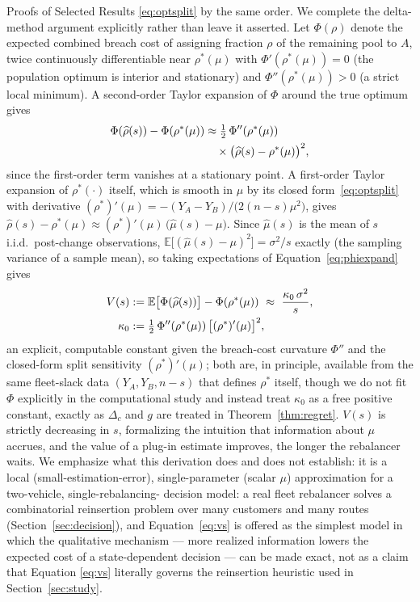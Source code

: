 \documentclass[trsc,dblanonrev]{informs4}
\newcommand{\E}{\mathbb{E}}
\begin{document}
\begin{APPENDIX}{Proofs of Selected Results}
\eqref{eq:optsplit} by the same order. We complete the
delta-method argument explicitly rather than leave it asserted. Let
$\Phi(\rho)$ denote the expected combined breach cost of assigning
fraction $\rho$ of the remaining pool to $A$, twice continuously
differentiable near $\rho^\ast(\mu)$ with $\Phi'(\rho^\ast(\mu)) = 0$
(the population optimum is interior and stationary) and
$\Phi''(\rho^\ast(\mu)) > 0$ (a strict local minimum). A second-order
Taylor expansion of $\Phi$ around the true optimum gives
\begin{align}
\Phi(\widehat\rho(s)) - \Phi(\rho^\ast(\mu))
&\approx \tfrac12\, \Phi''(\rho^\ast(\mu)) \notag \\
&\quad {}\times \bigl(\widehat\rho(s) - \rho^\ast(\mu)\bigr)^2,
\label{eq:phiexpand}
\end{align}
since the first-order term vanishes at a stationary point. A first-order
Taylor expansion of $\rho^\ast(\cdot)$ itself, which is smooth in $\mu$
by its closed form~\eqref{eq:optsplit} with derivative $(\rho^\ast)'(\mu)
= -(Y_A - Y_B)/\bigl(2(n-s)\mu^2\bigr)$, gives $\widehat\rho(s) -
\rho^\ast(\mu) \approx (\rho^\ast)'(\mu)\,\bigl(\widehat\mu(s) -
\mu\bigr)$. Since $\widehat\mu(s)$ is the mean of $s$ i.i.d.\
post-change observations, $\E\bigl[(\widehat\mu(s)-\mu)^2\bigr] =
\sigma^2/s$ exactly (the sampling variance of a sample mean), so taking
expectations of Equation~\eqref{eq:phiexpand} gives
\begin{align}
V(s) &:= \E\bigl[\Phi(\widehat\rho(s))\bigr] - \Phi(\rho^\ast(\mu))
\ \approx\ \frac{\kappa_0\, \sigma^2}{s}, \notag\\
\kappa_0 &:= \tfrac12\, \Phi''(\rho^\ast(\mu))\,
\bigl[(\rho^\ast)'(\mu)\bigr]^2, \notag
\end{align}
an explicit, computable constant given the breach-cost curvature
$\Phi''$ and the closed-form split sensitivity $(\rho^\ast)'(\mu)$;
both are, in principle, available from the same fleet-slack data
$(Y_A, Y_B, n-s)$ that defines $\rho^\ast$ itself, though we do not fit
$\Phi$ explicitly in the computational study and instead treat
$\kappa_0$ as a free positive constant, exactly as $\Delta_c$ and $g$
are treated in Theorem~\ref{thm:regret}. $V(s)$ is strictly decreasing
in $s$, formalizing the intuition that information about $\mu$
accrues, and the value of a plug-in estimate improves, the longer the
rebalancer waits. We emphasize what this derivation does and does not
establish: it is a local (small-estimation-error), single-parameter
(scalar $\mu$) approximation for a two-vehicle, single-rebalancing-
decision model: a real fleet rebalancer solves a combinatorial
reinsertion problem over many customers and many routes
(Section~\ref{sec:decision}), and Equation~\eqref{eq:vs} is offered as
the simplest model in which the qualitative mechanism --- more
realized information lowers the expected cost of a state-dependent
decision --- can be made exact, not as a claim that Equation
\eqref{eq:vs} literally governs the reinsertion heuristic used in
Section~\ref{sec:study}.


\end{APPENDIX}
\end{document}
